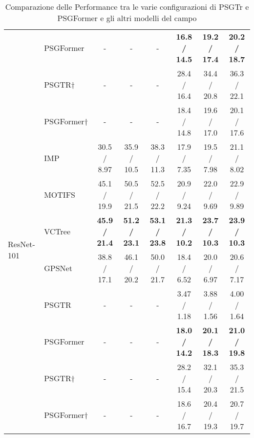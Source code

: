 \begin{table}[H]
{\begin{tabular}{llcccccc}
			         & PSGFormer  & -                                            & -                                          & -                    & \textbf{16.8 / 14.5} & \textbf{19.2 / 17.4} & \textbf{20.2 / 18.7} \\
			         & PSGTR†     & -                                            & -                                          & -                    & 28.4 / 16.4          & 34.4 / 20.8          & 36.3 / 22.1          \\
			         & PSGFormer† & -                                            & -                                          & -                    & 18.4 / 14.8          & 19.6 / 17.0          & 20.1 / 17.6          \\
			\midrule
			\multirow{6}{*}{ResNet-101}
			         & IMP        & 30.5 / 8.97                                  & 35.9 / 10.5                                & 38.3 / 11.3          & 17.9 / 7.35          & 19.5 / 7.98          & 21.1 / 8.02          \\
			         & MOTIFS     & 45.1 / 19.9                                  & 50.5 / 21.5                                & 52.5 / 22.2          & 20.9 / 9.24          & 22.0 / 9.69          & 22.9 / 9.89          \\
			         & VCTree     & \textbf{45.9 / 21.4}                         & \textbf{51.2 / 23.1}                       & \textbf{53.1 / 23.8} & \textbf{21.3 / 10.2} & \textbf{23.7 / 10.3} & \textbf{23.9 / 10.3} \\
			         & GPSNet     & 38.8 / 17.1                                  & 46.1 / 20.2                                & 50.0 / 21.7          & 18.4 / 6.52          & 20.0 / 6.97          & 20.6 / 7.17          \\
			         & PSGTR      & -                                            & -                                          & -                    & 3.47 / 1.18          & 3.88 / 1.56          & 4.00 / 1.64          \\
			         & PSGFormer  & -                                            & -                                          & -                    & \textbf{18.0 / 14.2} & \textbf{20.1 / 18.3} & \textbf{21.0 / 19.8} \\
			         & PSGTR†     & -                                            & -                                          & -                    & 28.2 / 15.4          & 32.1 / 20.3          & 35.3 / 21.5          \\
			         & PSGFormer† & -                                            & -                                          & -                    & 18.6 / 16.7          & 20.4 / 19.3          & 20.7 / 19.7          \\
			\bottomrule
		\end{tabular}
	}
	\caption{Comparazione delle Performance tra le varie configurazioni di PSGTr e PSGFormer e gli altri modelli del campo}
	\label{tab:results}
\end{table}
